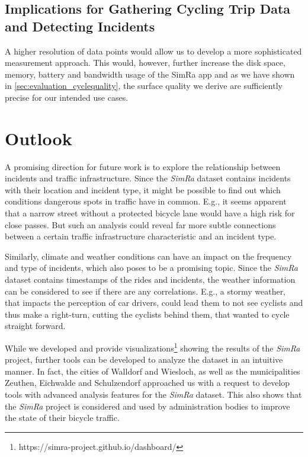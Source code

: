 \subsection*{Implications for Gathering Cycling Trip Data and Detecting Incidents}
A higher resolution of data points would allow us to develop a more sophisticated measurement approach.
This would, however, further increase the disk space, memory, battery and bandwidth usage of the SimRa app and as we have shown in \cref{sec:evaluation_cyclequality}, the surface quality we derive are sufficiently precise for our intended use cases.

\section{Outlook}
\label{sec:outlook}
A promising direction for future work is to explore the relationship between incidents and traffic infrastructure.
Since the \textit{SimRa} dataset contains incidents with their location and incident type, it might be possible to find out which conditions dangerous spots in traffic have in common.
E.g., it seems apparent that a narrow street without a protected bicycle lane would have a high risk for close passes.
But such an analysis could reveal far more subtle connections between a certain traffic infrastructure characteristic and an incident type.

Similarly, climate and weather conditions can have an impact on the frequency and type of incidents, which also poses to be a promising topic.
Since the \textit{SimRa} dataset contains timestamps of the rides and incidents, the weather information can be considered to see if there are any correlations.
E.g., a stormy weather, that impacts the perception of car drivers, could lead them to not see cyclists and thus make a right-turn, cutting the cyclists behind them, that wanted to cycle straight forward.

While we developed and provide visualizations\footnote{https://simra-project.github.io/dashboard/} showing the results of the \textit{SimRa} project, further tools can be developed to analyze the dataset in an intuitive manner.
In fact, the cities of Walldorf and Wiesloch, as well as the municipalities Zeuthen, Eichwalde and Schulzendorf approached us with a request to develop tools with advanced analysis features for the \textit{SimRa} dataset.
This also shows that the \textit{SimRa} project is considered and used by administration bodies to improve the state of their bicycle traffic.
 